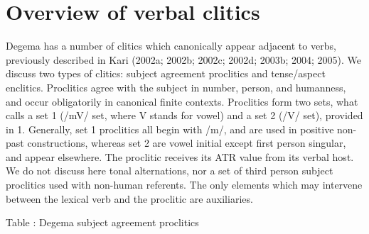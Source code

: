 \section{Overview of verbal clitics}

Degema has a number of clitics which canonically appear adjacent to verbs, previously described in Kari (2002a; 2002b; 2002c; 2002d; 2003b; 2004; 2005). We discuss two types of clitics: subject agreement proclitics and tense/aspect enclitics. Proclitics agree with the subject in number, person, and humanness, and occur obligatorily in canonical finite contexts. Proclitics form two sets, what \citet[333-335]{Kari2004} calls a set 1 (/mV/ set, where V stands for vowel) and a set 2 (/V/ set), provided in 1. Generally, set 1 proclitics all begin with /m/, and are used in positive non-past constructions, whereas set 2 are vowel initial except first person singular, and appear elsewhere. The proclitic receives its ATR value from its verbal host. We do not discuss here tonal alternations, nor a set of third person subject proclitics used with non-human referents. The only elements which may intervene between the lexical verb and the proclitic are auxiliaries.

\begin{stylelsTableHeading}
\label{bkm:Ref447870844}Table : Degema subject agreement proclitics
\end{stylelsTableHeading}

